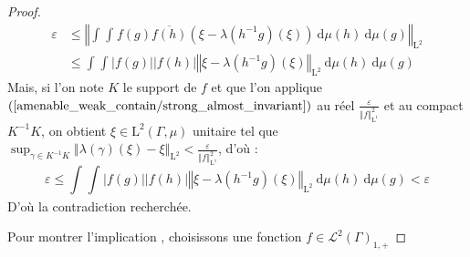 \documentclass[a4paper,12pt]{article}
\newcommand{\norm}[1]{\left\Vert #1\right\Vert}
\newcommand{\abs}[1]{\left\vert#1\right\vert}
\newcommand{\integral}[4]{\int_{#1}^{#2} #3~\mathrm{d}#4}
\newcommand{\inv}{^{-1}}
\renewcommand{\implies}{\Rightarrow}
\begin{document}
\begin{proof}
    \begin{align*}
        \varepsilon 
            &\le \norm{\integral{}{}{\integral{}{}{f(g)\overline{f(h)}(\xi - \lambda(h\inv g)(\xi))}{\mu(h)}}{\mu(g)}}_{\mathrm{L}^2} \\
            &\le \integral{}{}{\integral{}{}{\abs{f(g)}\abs{f(h)}\norm{\xi - \lambda(h\inv g)(\xi)}_{\mathrm{L}^2}}{\mu(h)}}{\mu(g)}
    \end{align*}
    Mais, si l'on note $K$ le support de $f$ et que l'on applique $(\ref{amenable_weak_contain/strong_almost_invariant})$ au réel $\frac{\varepsilon}{\norm{f}_{\mathrm{L}^1}^2}$ et au compact $K\inv K$,
    on obtient $\xi\in\mathrm{L}^2(\Gamma, \mu)$ unitaire tel que $\sup_{\gamma\in K\inv K} \norm{\lambda(\gamma)(\xi) - \xi}_{\mathrm{L}^2}<\frac{\varepsilon}{\norm{f}_{\mathrm{L}^1}^2}$, d'où :
    \begin{equation*}
        \varepsilon
            \le \integral{}{}{\integral{}{}{\abs{f(g)}\abs{f(h)}\norm{\xi - \lambda(h\inv g)(\xi)}_{\mathrm{L}^2}}{\mu(h)}}{\mu(g)} 
            < \varepsilon
    \end{equation*}
    D'où la contradiction recherchée.

    Pour montrer l'implication \framebox{$(\ref{amenable_weak_contain/weak_contain})\implies(\ref{amenable_weak_contain/norm_eq_two})$}, choisissons une fonction 
    $f\in\mathscr{L}^2(\Gamma)_{1, +}$


\end{proof}
\end{document}
